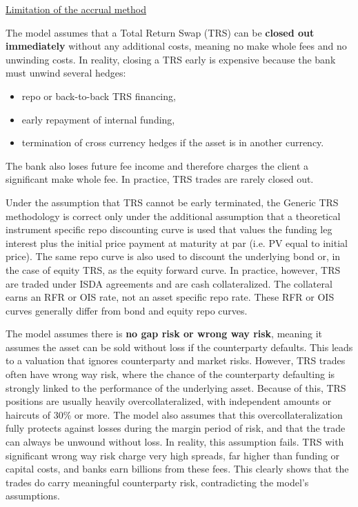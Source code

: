 \underline{Limitation of the accrual method}
\label{pricing:limitation_trs_wrong_way_risk}

The model assumes that a Total Return Swap (TRS) can be \textbf{closed out immediately} without any additional costs,
meaning no make whole fees and no unwinding costs. In reality, closing a TRS early is expensive because the bank must
unwind several hedges:
\begin{itemize}
\item repo or back-to-back TRS financing,
\item early repayment of internal funding,
\item termination of cross currency hedges if the asset is in another currency.
\end{itemize}
The bank also loses future fee income and therefore charges the client a significant make whole fee.
In practice, TRS trades are rarely closed out.

\smallskip

Under the assumption that TRS cannot be early terminated, the Generic TRS methodology is correct only under the additional assumption
that a theoretical instrument specific repo discounting curve is used that values the funding leg interest plus the initial price
payment at maturity at par (i.e. PV equal to initial price). The same repo curve is also used to discount the underlying bond or,
in the case of equity TRS, as the equity forward curve. In practice, however, TRS are traded under ISDA agreements and are cash
collateralized. The collateral earns an RFR or OIS rate, not an asset specific repo rate. These RFR or OIS curves generally differ
from bond and equity repo curves.

\smallskip

The model assumes there is \textbf{no gap risk or wrong way risk}, meaning it assumes the asset can be sold without
loss if the counterparty defaults. This leads to a valuation that ignores counterparty and market risks.
However, TRS trades often have wrong way risk, where the chance of the counterparty defaulting is strongly linked to
the performance of the underlying asset. Because of this, TRS positions are usually heavily overcollateralized,
with independent amounts or haircuts of 30\% or more. The model also assumes that this overcollateralization fully
protects against losses during the margin period of risk, and that the trade can always be unwound without loss.
In reality, this assumption fails. TRS with significant wrong way risk charge very high spreads, far higher than
funding or capital costs, and banks earn billions from these fees. This clearly shows that the trades do carry
meaningful counterparty risk, contradicting the model's assumptions.

